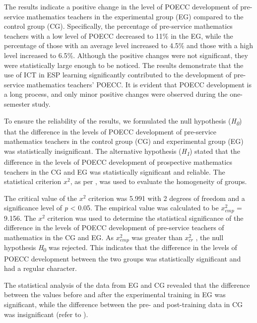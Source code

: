 The results indicate a positive change in the level of POECC development
of pre-service mathematics teachers in the experimental group (EG)
compared to the control group (CG). Specifically, the percentage of
pre-service mathematics teachers with a low level of POECC decreased to
11\% in the EG, while the percentage of those with an average level
increased to 4.5\% and those with a high level increased to 6.5\%.
Although the positive changes were not significant, they were
statistically large enough to be noticed. The results demonstrate that
the use of ICT in ESP learning significantly contributed to the
development of pre-service mathematics teachers' POECC. It is evident
that POECC development is a long process, and only minor positive
changes were observed during the one-semester study.
	
To ensure the reliability of the results, we formulated the null
hypothesis (\emph{H}\textsubscript{\emph{0}}) that the difference in the
levels of POECC development of pre-service mathematics teachers in the
control group (CG) and experimental group (EG) was statistically
insignificant. The alternative hypothesis
(\emph{H}\textsubscript{\emph{1}}) stated that the difference in the
levels of POECC development of prospective mathematics teachers in the
CG and EG was statistically significant and reliable. The statistical
criterion $x^{2}$, as per , was used to evaluate the homogeneity of groups.
	
The critical value of the $x^{2}$ criterion was 5.991 with 2 degrees of freedom
and a significance level of \emph{p} \textless{} 0.05. The empirical
value was calculated to be $x_{emp}^{2}$ = 9.156. The $x^{2}$ criterion was used to determine
the statistical significance of the difference in the levels of POECC
development of pre-service teachers of mathematics in the CG and EG. As
$x_{emp}^{2}$ was greater than $x_{cr}^{2}$ , the null hypothesis \emph{H}\textsubscript{0} was
rejected. This indicates that the difference in the levels of POECC
development between the two groups was statistically significant and had
a regular character.

The statistical analysis of the data from EG and CG revealed that the
difference between the values before and after the experimental training
in EG was significant, while the difference between the pre- and
post-training data in CG was insignificant (refer to ).
	
